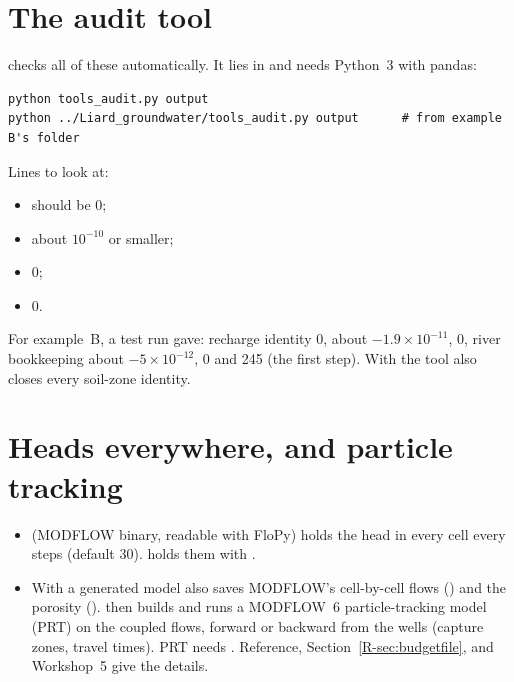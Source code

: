\section{The audit tool}\label{sec:uaudit}
 checks all of these automatically. It lies in  and needs Python~3
with pandas:
\begin{lstlisting}
python tools_audit.py output
python ../Liard_groundwater/tools_audit.py output      # from example B's folder
\end{lstlisting}
Lines to look at:
\begin{itemize}
\item {} should be 0;
\item {} about $10^{-10}$ or smaller;
\item {} 0;
\item {} 0.
\end{itemize}
For example~B, a test run gave: recharge identity 0,  about $-1.9\times10^{-11}$,
 0, river bookkeeping about $-5\times10^{-12}$,  0 and 
245 (the first step). With  the tool also closes every soil-zone identity.

\section{Heads everywhere, and particle tracking}
\begin{itemize}
\item {} (MODFLOW binary, readable with FloPy) holds the head in every cell every 
steps (default 30).  holds them with .
\item With  a generated model also saves MODFLOW's cell-by-cell flows () and the
porosity ().  then builds and runs a MODFLOW~6 particle-tracking model (PRT)
on the coupled flows, forward or backward from the wells (capture zones, travel times). PRT needs .
Reference, Section~\ref{R-sec:budgetfile}, and Workshop~5 give the details.
\end{itemize}
